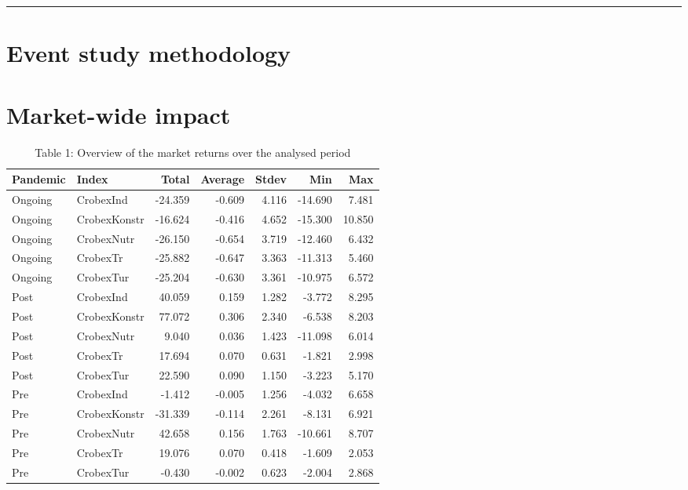 \documentclass[
]{article}
\begin{document}
\begin{center}\rule{0.5\linewidth}{0.5pt}\end{center}

\hypertarget{event-study-methodology}{%
\section{Event study methodology}\label{event-study-methodology}}

\hypertarget{market-wide-impact}{%
\section{Market-wide impact}\label{market-wide-impact}}

\begin{table}

\caption{\label{tab:unnamed-chunk-2}Table 1: Overview of the market returns over the analysed period}
\centering
\begin{tabular}[t]{l|l|r|r|r|r|r}
\hline
Pandemic & Index & Total & Average & Stdev & Min & Max\\
\hline
Ongoing & CrobexInd & -24.359 & -0.609 & 4.116 & -14.690 & 7.481\\
\hline
Ongoing & CrobexKonstr & -16.624 & -0.416 & 4.652 & -15.300 & 10.850\\
\hline
Ongoing & CrobexNutr & -26.150 & -0.654 & 3.719 & -12.460 & 6.432\\
\hline
Ongoing & CrobexTr & -25.882 & -0.647 & 3.363 & -11.313 & 5.460\\
\hline
Ongoing & CrobexTur & -25.204 & -0.630 & 3.361 & -10.975 & 6.572\\
\hline
Post & CrobexInd & 40.059 & 0.159 & 1.282 & -3.772 & 8.295\\
\hline
Post & CrobexKonstr & 77.072 & 0.306 & 2.340 & -6.538 & 8.203\\
\hline
Post & CrobexNutr & 9.040 & 0.036 & 1.423 & -11.098 & 6.014\\
\hline
Post & CrobexTr & 17.694 & 0.070 & 0.631 & -1.821 & 2.998\\
\hline
Post & CrobexTur & 22.590 & 0.090 & 1.150 & -3.223 & 5.170\\
\hline
Pre & CrobexInd & -1.412 & -0.005 & 1.256 & -4.032 & 6.658\\
\hline
Pre & CrobexKonstr & -31.339 & -0.114 & 2.261 & -8.131 & 6.921\\
\hline
Pre & CrobexNutr & 42.658 & 0.156 & 1.763 & -10.661 & 8.707\\
\hline
Pre & CrobexTr & 19.076 & 0.070 & 0.418 & -1.609 & 2.053\\
\hline
Pre & CrobexTur & -0.430 & -0.002 & 0.623 & -2.004 & 2.868\\
\hline
\end{tabular}
\end{table}
\end{document}
